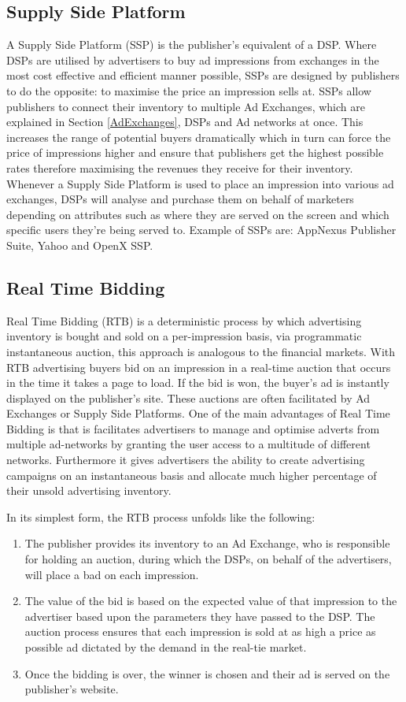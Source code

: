 \documentclass{article}
\begin{document}
\subsection{Supply Side Platform} \label{SSP}
A Supply Side Platform (SSP) is the publisher's equivalent of a DSP. Where DSPs are utilised by advertisers to buy ad impressions from exchanges in the most cost effective and efficient manner possible, SSPs are designed by publishers to do the opposite: to maximise the price an impression sells at. SSPs allow publishers to connect their inventory to multiple Ad Exchanges, which are explained in Section \ref{AdExchanges}, DSPs and Ad networks at once. This increases the range of potential buyers dramatically which in turn can force the price of impressions higher and ensure that publishers get the highest possible rates therefore maximising the revenues they receive for their inventory. Whenever a Supply Side Platform is used to place an impression into various ad exchanges, DSPs will analyse and purchase them on behalf of marketers depending on attributes such as where they are served on the screen and which specific users they're being served to. Example of SSPs are: AppNexus Publisher Suite, Yahoo and OpenX SSP.  

\subsection{Real Time Bidding}
Real Time Bidding (RTB) is a deterministic process by which advertising inventory is bought and sold on a per-impression basis, via programmatic instantaneous auction, this approach is analogous to the financial markets. With RTB advertising buyers bid on an impression in a real-time auction that occurs in the time it takes a page to load. If the bid is won, the buyer's ad is instantly displayed on the publisher's site. These auctions are often facilitated by Ad Exchanges or Supply Side Platforms. One of the main advantages of Real Time Bidding is that is facilitates advertisers to manage and optimise adverts from multiple ad-networks by granting the user access to a multitude of different networks. Furthermore it gives advertisers the ability to create advertising campaigns on an instantaneous basis and allocate much higher percentage of their unsold advertising inventory. \newline

In its simplest form, the RTB process unfolds like the following: 
\begin{enumerate}
\item The publisher provides its inventory to an Ad Exchange, who is responsible for holding an auction, during which the DSPs, on behalf of the advertisers, will place a bad on each impression. 
\item The value of the bid is based on the expected value of that impression to the advertiser based upon the parameters they have passed to the DSP. The auction process ensures that each impression is sold at as high a price as possible ad dictated by the demand in the real-tie market. 
\item Once the bidding is over, the winner is chosen and their ad is served on the publisher's website. 
\end{enumerate}
\end{document}
